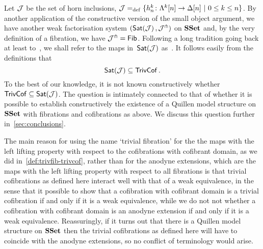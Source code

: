 \documentclass[reqno,10pt,a4paper,oneside,draft]{amsart}
\begin{document}
\begin{remark} Let $\cal{J}$ be the set of horn inclusions, \ie $\cal{J} \defeq \{ h^k_n  \co \Lambda^k[n] \to \Delta[n]  \ | \ 0 \leq k \leq n \}$. By another application of the constructive version of the small object argument, we have another weak factorisation system $( \mathsf{Sat}(\cal{J}) \, , \cal{J}^\pitchfork)$ on $\SSet$ and, by the very definition of a fibration, we have $\cal{J}^\pitchfork = \Fib$. Following a long tradition going back at least to~\cite{gabriel-zisman:calculus-of-fractions}, we shall refer to the maps in~$\mathsf{Sat}(\cal{J})$ as~. It follows easily from the definitions that 
\[
  \mathsf{Sat}(\cal{J}) \subseteq \TrivCof  \, .
\]
To the best of our knowledge, it is not known constructively whether $\TrivCof \subseteq \Sat(\cal{J})$. The question is intimately connected to that of whether it is possible to establish constructively the existence of a
Quillen model structure on $\SSet$ with fibrations and cofibrations as above. We discuss this question further in~\cref{sec:conclusions}.

The main reason for using the name `trivial fibration' for the the maps with the left lifting property with respect to the cofibrations with cofibrant domain, as we did in~\cref{def:trivfib-trivcof}, rather than for the anodyne extensions, which are the maps with the left lifting property with respect to all fibrations is that
 trivial cofibrations as defined here interact well with that of a weak equivalence, in the sense that it
 possible to show that a  cofibration with cofibrant domain is a trivial cofibration if and only if it is a weak equivalence, while we do not not whether a cofibration with cofibrant domain is an anodyne extension if
 and only if it is a weak equivalence. Reassuringly, if it turns out that there is a Quillen model structure on $\SSet$ then the trivial cofibrations as defined here will have to coincide with the anodyne extensions, so no conflict of terminology would arise. 
 \end{remark}








\bigskip





\bigskip
\end{document}
